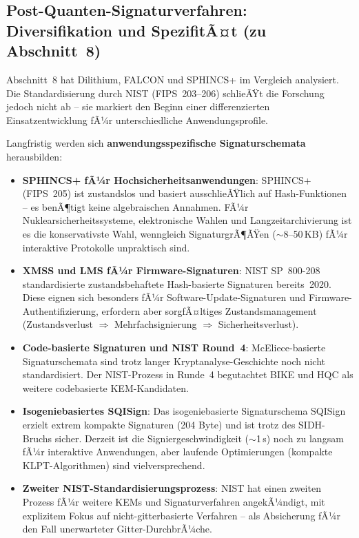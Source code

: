 ﻿\documentclass[a4paper,12pt]{article}
\theoremstyle{definition}
\begin{document}
\subsection{Post-Quanten-Signaturverfahren: Diversifikation und SpezifitÃ¤t (zu Abschnitt~8)}

Abschnitt~8 hat Dilithium, FALCON und SPHINCS+ im Vergleich analysiert.
Die Standardisierung durch NIST (FIPS~203--206) schlieÃŸt die Forschung
jedoch nicht ab -- sie markiert den Beginn einer differenzierten
Einsatzentwicklung fÃ¼r unterschiedliche Anwendungsprofile.

Langfristig werden sich \textbf{anwendungsspezifische
Signaturschemata} herausbilden:
\begin{itemize}
  \item \textbf{SPHINCS+ fÃ¼r Hochsicherheitsanwendungen}:
    SPHINCS+ (FIPS~205) ist zustandslos und basiert ausschlieÃŸlich
    auf Hash-Funktionen -- es benÃ¶tigt keine algebraischen Annahmen.
    FÃ¼r Nuklearsicherheitssysteme, elektronische Wahlen und
    Langzeitarchivierung ist es die konservativste Wahl, wenngleich
    SignaturgrÃ¶ÃŸen ($\sim$8--50\,KB) fÃ¼r interaktive Protokolle
    unpraktisch sind.
  \item \textbf{XMSS und LMS fÃ¼r Firmware-Signaturen}:
    NIST SP~800-208 standardisierte zustandsbehaftete
    Hash-basierte Signaturen bereits~2020. Diese eignen sich
    besonders fÃ¼r Software-Update-Signaturen und Firmware-Authentifizierung,
    erfordern aber sorgfÃ¤ltiges Zustandsmanagement (Zustandsverlust
    $\Rightarrow$ Mehrfachsignierung $\Rightarrow$ Sicherheitsverlust).
  \item \textbf{Code-basierte Signaturen und NIST Round~4}:
    McEliece-basierte Signaturschemata sind trotz langer
    Kryptanalyse-Geschichte noch nicht standardisiert.
    Der NIST-Prozess in Runde~4 begutachtet BIKE und HQC
    als weitere codebasierte KEM-Kandidaten.
  \item \textbf{Isogeniebasiertes SQISign}: Das isogeniebasierte
    Signaturschema SQISign erzielt extrem kompakte Signaturen
    (204 Byte) und ist trotz des SIDH-Bruchs sicher.
    Derzeit ist die Signiergeschwindigkeit ($\sim$1\,s) noch
    zu langsam fÃ¼r interaktive Anwendungen, aber laufende
    Optimierungen (kompakte KLPT-Algorithmen) sind vielversprechend.
  \item \textbf{Zweiter NIST-Standardisierungsprozess}:
    NIST hat einen zweiten Prozess fÃ¼r weitere KEMs und
    Signaturverfahren angekÃ¼ndigt, mit explizitem Fokus
    auf nicht-gitterbasierte Verfahren -- als Absicherung
    fÃ¼r den Fall unerwarteter Gitter-DurchbrÃ¼che.
\end{itemize}
\end{document}

